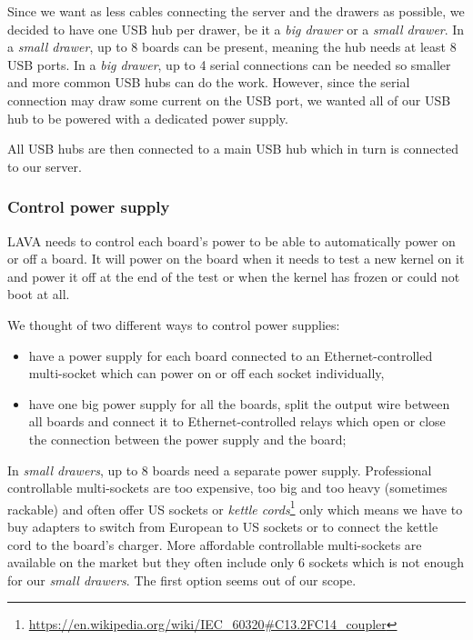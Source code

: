 Since we want as less cables connecting the server and the drawers as possible, we decided to have one USB hub per drawer, be it a \textit{big drawer} or a \textit{small drawer}. In a \textit{small drawer}, up to 8 boards can be present, meaning the hub needs at least 8 USB ports. In a \textit{big drawer}, up to 4 serial connections can be needed so smaller and more common USB hubs can do the work. However, since the serial connection may draw some current on the USB port, we wanted all of our USB hub to be powered with a dedicated power supply.

All USB hubs are then connected to a main USB hub which in turn is connected to our server.

\subsubsection{Control power supply}

LAVA needs to control each board's power to be able to automatically power on or off a board. It will power on the board when it needs to test a new kernel on it and power it off at the end of the test or when the kernel has frozen or could not boot at all.

We thought of two different ways to control power supplies:
\begin{itemize}
  \item have a power supply for each board connected to an Ethernet-controlled multi-socket which can power on or off each socket individually,
  \item have one big power supply for all the boards, split the output wire between all boards and connect it to Ethernet-controlled relays which open or close the connection between the power supply and the board;
\end{itemize}

In \textit{small drawers}, up to 8 boards need a separate power supply. Professional controllable multi-sockets are too expensive, too big and too heavy (sometimes rackable) and often offer US sockets or \textit{kettle cords}\footnote{\url{https://en.wikipedia.org/wiki/IEC\_60320\#C13.2FC14\_coupler}} only which means we have to buy adapters to switch from European to US sockets or to connect the kettle cord to the board's charger. More affordable controllable multi-sockets are available on the market but they often include only 6 sockets which is not enough for our \textit{small drawers}. The first option seems out of our scope.

